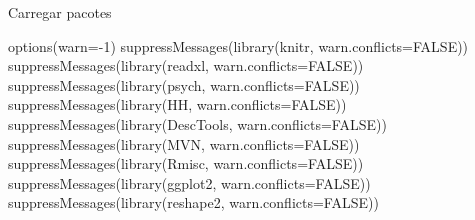 \documentclass[
  ignorenonframetext,
]{beamer}
\newenvironment{Shaded}{}{}
\newcommand{\AttributeTok}[1]{\textcolor[rgb]{0.49,0.56,0.16}{#1}}
\newcommand{\ConstantTok}[1]{\textcolor[rgb]{0.53,0.00,0.00}{#1}}
\newcommand{\DecValTok}[1]{\textcolor[rgb]{0.25,0.63,0.44}{#1}}
\newcommand{\FunctionTok}[1]{\textcolor[rgb]{0.02,0.16,0.49}{#1}}
\newcommand{\NormalTok}[1]{#1}
\newcommand{\SpecialCharTok}[1]{\textcolor[rgb]{0.25,0.44,0.63}{#1}}
\begin{document}
\begin{frame}[fragile]{Carregar pacotes}
\protect\hypertarget{carregar-pacotes}{}
\begin{Shaded}
\begin{Highlighting}[]
\FunctionTok{options}\NormalTok{(}\AttributeTok{warn=}\SpecialCharTok{{-}}\DecValTok{1}\NormalTok{)}
\FunctionTok{suppressMessages}\NormalTok{(}\FunctionTok{library}\NormalTok{(knitr, }\AttributeTok{warn.conflicts=}\ConstantTok{FALSE}\NormalTok{))}
\FunctionTok{suppressMessages}\NormalTok{(}\FunctionTok{library}\NormalTok{(readxl, }\AttributeTok{warn.conflicts=}\ConstantTok{FALSE}\NormalTok{))}
\FunctionTok{suppressMessages}\NormalTok{(}\FunctionTok{library}\NormalTok{(psych, }\AttributeTok{warn.conflicts=}\ConstantTok{FALSE}\NormalTok{))}
\FunctionTok{suppressMessages}\NormalTok{(}\FunctionTok{library}\NormalTok{(HH, }\AttributeTok{warn.conflicts=}\ConstantTok{FALSE}\NormalTok{))}
\FunctionTok{suppressMessages}\NormalTok{(}\FunctionTok{library}\NormalTok{(DescTools, }\AttributeTok{warn.conflicts=}\ConstantTok{FALSE}\NormalTok{))}
\FunctionTok{suppressMessages}\NormalTok{(}\FunctionTok{library}\NormalTok{(MVN, }\AttributeTok{warn.conflicts=}\ConstantTok{FALSE}\NormalTok{))}
\FunctionTok{suppressMessages}\NormalTok{(}\FunctionTok{library}\NormalTok{(Rmisc, }\AttributeTok{warn.conflicts=}\ConstantTok{FALSE}\NormalTok{))}
\FunctionTok{suppressMessages}\NormalTok{(}\FunctionTok{library}\NormalTok{(ggplot2, }\AttributeTok{warn.conflicts=}\ConstantTok{FALSE}\NormalTok{))}
\FunctionTok{suppressMessages}\NormalTok{(}\FunctionTok{library}\NormalTok{(reshape2, }\AttributeTok{warn.conflicts=}\ConstantTok{FALSE}\NormalTok{))}
\end{Highlighting}
\end{Shaded}
\end{frame}
\end{document}
